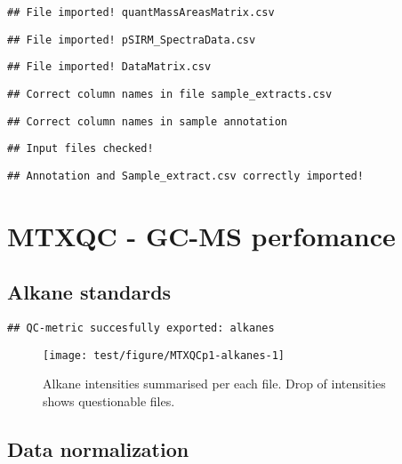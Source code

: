 \documentclass[9pt,]{article}
\begin{document}
\begin{verbatim}
## File imported! quantMassAreasMatrix.csv
\end{verbatim}

\begin{verbatim}
## File imported! pSIRM_SpectraData.csv
\end{verbatim}

\begin{verbatim}
## File imported! DataMatrix.csv
\end{verbatim}

\begin{verbatim}
## Correct column names in file sample_extracts.csv
\end{verbatim}

\begin{verbatim}
## Correct column names in sample annotation
\end{verbatim}

\begin{verbatim}
## Input files checked!
\end{verbatim}

\begin{verbatim}
## Annotation and Sample_extract.csv correctly imported!
\end{verbatim}

\section{MTXQC - GC-MS perfomance}\label{mtxqc---gc-ms-perfomance}

\subsection{Alkane standards}\label{alkane-standards}

\begin{verbatim}
## QC-metric succesfully exported: alkanes
\end{verbatim}

\begin{figure}

{\centering \texttt{[image: test/figure/MTXQCp1-alkanes-1]} 

}

\caption{Alkane intensities summarised per each file. Drop of intensities shows questionable files.}\label{fig:alkanes}
\end{figure}

\subsection{Data normalization}\label{data-normalization}
\end{document}
